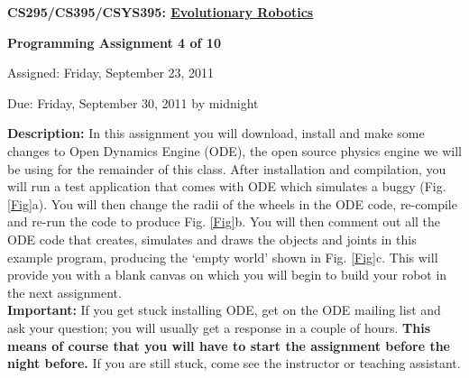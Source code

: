 \documentclass[12pt]{article}
\begin{document}
\centerline{\bf \Large CS295/CS395/CSYS395: \href{CS295_395_Syllabus.pdf}{\underline{Evolutionary Robotics}}}

\vspace{0.5cm}

\centerline{\bf \large Programming Assignment 4 of 10}

\vspace{0.5cm}

\centerline{\large Assigned: Friday, September 23, 2011}

\vspace{0.5cm}

\centerline{\large Due: Friday, September 30, 2011 by midnight}

\vspace{0.5cm}

\noindent \textbf{Description:} In this assignment you will download, install and make some changes to Open Dynamics Engine (ODE), the open source physics engine we will be using for the remainder of this class. After installation and compilation, you will run a test application that comes with ODE which simulates a buggy (Fig. \ref{Fig}a). You will then change the radii of the wheels in the ODE code, re-compile and re-run the code to produce Fig. \ref{Fig}b. You will then comment out all the ODE code that creates, simulates and draws the objects and joints in this example program, producing the `empty world' shown in Fig. \ref{Fig}c. This will provide you with a blank canvas on which you will begin to build your robot in the next assignment. \\

\noindent \textbf{Important:} If you get stuck installing ODE, get on the ODE mailing list and ask your question; you will usually get a response in a couple of hours. \textbf{This means of course that you will have to start the assignment before the night before.} If you are still stuck, come see the instructor or teaching assistant.
\end{document}
